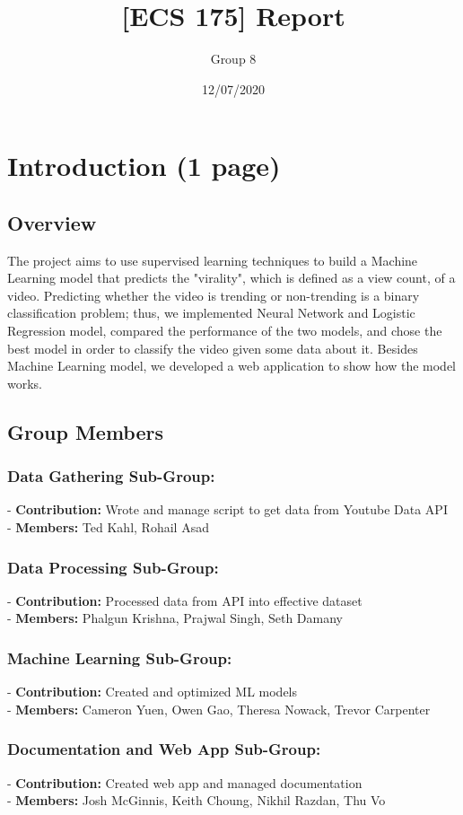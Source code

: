 \documentclass{article}
\title{[ECS 175] Report}
\date{12/07/2020}
\author{Group 8}
\begin{document}
\maketitle

\section*{Introduction (1 page)}
\subsection*{Overview}
The project aims to use supervised learning techniques to build a Machine Learning model that predicts the "virality", which is defined as a view count, of a video. Predicting whether the video is trending or non-trending is a binary classification problem; thus, we implemented Neural Network and Logistic Regression model, compared the performance of the two models, and chose the best model in order to classify the video given some data about it. Besides Machine Learning model, we developed a web application to show how the model works. 

\subsection*{Group Members}
\subsubsection*{Data Gathering Sub-Group:}
- \textbf{Contribution:} Wrote and manage script to get data from Youtube Data API \\
- \textbf{Members:} Ted Kahl, Rohail Asad
\subsubsection*{Data Processing Sub-Group:}
- \textbf{Contribution:} Processed data from API into effective dataset \\
- \textbf{Members:} Phalgun Krishna, Prajwal Singh, Seth Damany
\subsubsection*{Machine Learning Sub-Group:}
- \textbf{Contribution:} Created and optimized ML models \\
- \textbf{Members:} Cameron Yuen, Owen Gao, Theresa Nowack, Trevor Carpenter
\subsubsection*{Documentation and Web App Sub-Group:}
- \textbf{Contribution:} Created web app and managed documentation \\
- \textbf{Members:} Josh McGinnis, Keith Choung, Nikhil Razdan, Thu Vo
\end{document}
